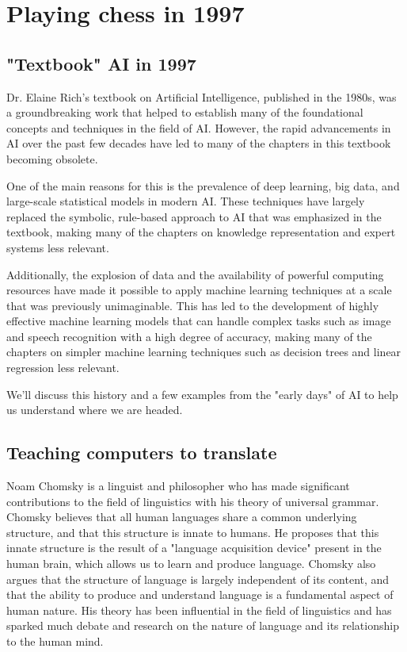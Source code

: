 \setchapterpreamble[u]{\margintoc}
\chapter{Playing chess in 1997}

\section{"Textbook" AI in 1997}

Dr. Elaine Rich's textbook on Artificial Intelligence, published in the 1980s, was a groundbreaking work that helped to establish many of the foundational concepts and techniques in the field of AI. However, the rapid advancements in AI over the past few decades have led to many of the chapters in this textbook becoming obsolete.

One of the main reasons for this is the prevalence of deep learning, big data, and large-scale statistical models in modern AI. These techniques have largely replaced the symbolic, rule-based approach to AI that was emphasized in the textbook, making many of the chapters on knowledge representation and expert systems less relevant.

Additionally, the explosion of data and the availability of powerful computing resources have made it possible to apply machine learning techniques at a scale that was previously unimaginable. This has led to the development of highly effective machine learning models that can handle complex tasks such as image and speech recognition with a high degree of accuracy, making many of the chapters on simpler machine learning techniques such as decision trees and linear regression less relevant.  


We'll discuss this history and a few examples from the "early days" of AI to help us understand where we are headed.

\section{Teaching computers to translate}

Noam Chomsky is a linguist and philosopher who has made significant contributions to the field of linguistics with his theory of universal grammar. Chomsky believes that all human languages share a common underlying structure, and that this structure is innate to humans. He proposes that this innate structure is the result of a "language acquisition device" present in the human brain, which allows us to learn and produce language. Chomsky also argues that the structure of language is largely independent of its content, and that the ability to produce and understand language is a fundamental aspect of human nature. His theory has been influential in the field of linguistics and has sparked much debate and research on the nature of language and its relationship to the human mind.


